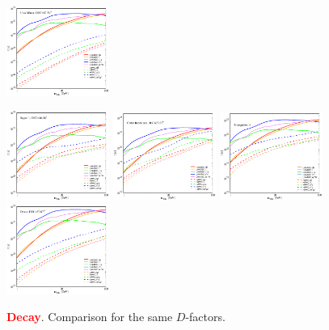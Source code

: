 \documentclass[aps,prd,amsmath,amssymb,showpacs,floats,floatfix,nofootinbib,reprint]{revtex4-1}
\def\red#1{{\textcolor{red}{#1}}} %
\begin{document}
\begin{figure}
{\includegraphics[width=0.3\textwidth]{comparison_urminor.eps}}
\label{fig:dsph-comparison}
\end{figure}

\begin{figure}[!htbp]
\caption{\textbf{\red{Decay}}. Comparison for the same $D$-factors.}
{\includegraphics[width=0.3\textwidth]{comparison_segue1-hawc.eps}}
{\includegraphics[width=0.3\textwidth]{comparison_comab-hawc.eps}}
{\includegraphics[width=0.3\textwidth]{comparison_trian2-hawc.eps}}
{\includegraphics[width=0.3\textwidth]{comparison_draco-hawc.eps}}

\end{figure}
\end{document}

